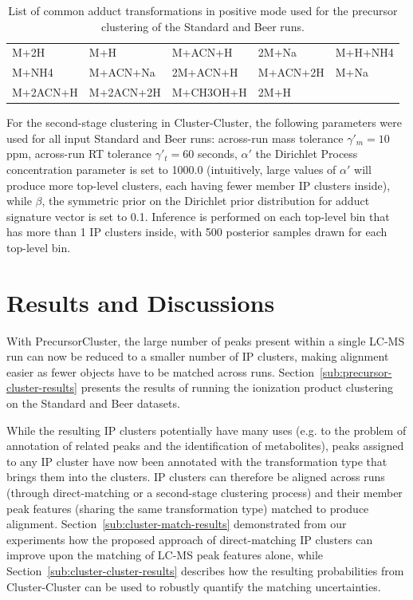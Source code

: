 \begin{table}[!htbp]
\caption{List of common adduct transformations in positive mode used for the precursor clustering of the Standard and Beer runs.\label{Tab:transformation}}{\begin{tabular}{@{}lllll@{}}
M+2H & M+H & M+ACN+H & 2M+Na & M+H+NH4\\
M+NH4 & M+ACN+Na & 2M+ACN+H & M+ACN+2H & M+Na\\
M+2ACN+H & M+2ACN+2H & M+CH3OH+H & 2M+H
\end{tabular}}{}
\end{table}

For the second-stage clustering in Cluster-Cluster, the following parameters were used for all input Standard and Beer runs: across-run mass tolerance $\gamma'_m=10$ ppm, across-run RT tolerance $\gamma'_t=60$ seconds, $\alpha'$ the Dirichlet Process concentration parameter is set to 1000.0 (intuitively, large values of $\alpha'$ will produce more top-level clusters, each having fewer member IP clusters inside), while $\beta$, the symmetric prior on the Dirichlet prior distribution for adduct signature vector is set to 0.1. Inference is performed on each top-level bin that has more than 1 IP clusters inside, with 500 posterior samples drawn for each top-level bin.

\section{Results and Discussions}

With PrecursorCluster, the large number of peaks present within a single LC-MS run can now be reduced to a smaller number of IP clusters, making alignment easier as fewer objects have to be matched across runs. Section~\ref{sub:precursor-cluster-results} presents the results of running the ionization product clustering on the Standard and Beer datasets. 

While the resulting IP clusters potentially have many uses (e.g. to the problem of annotation of related peaks and the identification of metabolites), peaks assigned to any IP cluster have now been annotated with the transformation type that brings them into the clusters. IP clusters can therefore be aligned across runs (through direct-matching or a second-stage clustering process) and their member peak features (sharing the same transformation type) matched to produce alignment. Section~\ref{sub:cluster-match-results} demonstrated from our experiments how the proposed approach of direct-matching IP clusters can improve upon the matching of LC-MS peak features alone, while Section~\ref{sub:cluster-cluster-results} describes how the resulting probabilities from Cluster-Cluster can be used to robustly quantify the matching uncertainties.

